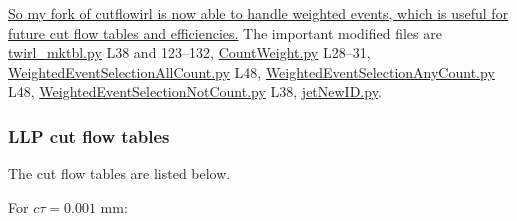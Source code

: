\uline{So my fork of cutflowirl is now able to handle weighted events, which is useful for future cut flow tables and efficiencies.} The important modified files are \href{run:sec30/cutflowirl/twirl_mktbl.py}{twirl\_mktbl.py} L38 and 123--132, \href{run:sec30/cutflowirl/atlogic/EventSelectionModules/CountWeight.py}{CountWeight.py} L28--31, \href{run:sec30/cutflowirl/atlogic/EventSelectionModules/WeightedEventSelectionAllCount.py}{WeightedEventSelectionAllCount.py} L48, \href{run:sec30/cutflowirl/atlogic/EventSelectionModules/WeightedEventSelectionAnyCount.py}{WeightedEventSelectionAnyCount.py} L48, \href{run:sec30/cutflowirl/atlogic/EventSelectionModules/WeightedEventSelectionNotCount.py}{WeightedEventSelectionNotCount.py} L38, \href{run:sec30/cutflowirl/atlogic/Scribblers/jetNewID.py}{jetNewID.py}.


\subsubsection{LLP cut flow tables}

The cut flow tables are listed below.

For $c\tau = 0.001$ mm:

